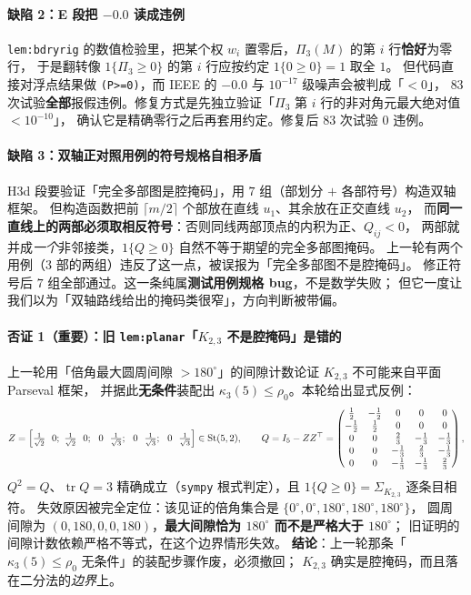 \documentclass[UTF8,11pt]{ctexart}
\theoremstyle{definition}
\newcommand{\tr}{\operatorname{tr}}
\begin{document}
\paragraph{缺陷 2：E 段把 $-0.0$ 读成违例}
\texttt{lem:bdryrig} 的数值检验里，把某个权 $w_i$ 置零后，$\Pi_3(M)$ 的第 $i$ 行\textbf{恰好}为零行，
于是翻转像 $1\{\Pi_3\ge0\}$ 的第 $i$ 行应按约定 $1\{0\ge0\}=1$ 取全 $1$。
但代码直接对浮点结果做 \texttt{(P>=0)}，而 IEEE 的 $-0.0$ 与 $10^{-17}$ 级噪声会被判成「$<0$」，
$83$ 次试验\textbf{全部}报假违例。修复方式是先独立验证「$\Pi_3$ 第 $i$ 行的非对角元最大绝对值 $<10^{-10}$」，
确认它是精确零行之后再套用约定。修复后 $83$ 次试验 $0$ 违例。

\paragraph{缺陷 3：双轴正对照用例的符号规格自相矛盾}
H3d 段要验证「完全多部图是腔掩码」，用 $7$ 组（部划分 $+$ 各部符号）构造双轴框架。
但构造函数把前 $\lceil m/2\rceil$ 个部放在直线 $u_1$、其余放在正交直线 $u_2$，
而\textbf{同一直线上的两部必须取相反符号}：否则同线两部顶点的内积为正、$Q_{ij}<0$，
两部就并成\emph{一个}非邻接类，$1\{Q\ge0\}$ 自然不等于期望的完全多部图掩码。
上一轮有两个用例（$3$ 部的两组）违反了这一点，被误报为「完全多部图不是腔掩码」。
修正符号后 $7$ 组全部通过。这一条纯属\textbf{测试用例规格 bug}，不是数学失败；
但它一度让我们以为「双轴路线给出的掩码类很窄」，方向判断被带偏。

\paragraph{否证 1（重要）：旧 \texttt{lem:planar}「$K_{2,3}$ 不是腔掩码」是\textbf{错的}}
上一轮用「倍角最大圆周间隙 $>180^\circ$」的间隙计数论证 $K_{2,3}$ 不可能来自平面 Parseval 框架，
并据此\textbf{无条件}装配出 $\kappa_3(5)\le\rho_0$。本轮给出显式反例：
\[
Z=\Bigl[\tfrac1{\sqrt2}\ \ 0;\ \tfrac1{\sqrt2}\ \ 0;\ \ 0\ \ \tfrac1{\sqrt3};\ \ 0\ \ \tfrac1{\sqrt3};\ \ 0\ \ \tfrac1{\sqrt3}\Bigr]\in\mathrm{St}(5,2),
\qquad Q=I_5-ZZ^\top=\begin{pmatrix}
\frac12&-\frac12&0&0&0\\[1pt]
-\frac12&\frac12&0&0&0\\[1pt]
0&0&\frac23&-\frac13&-\frac13\\[1pt]
0&0&-\frac13&\frac23&-\frac13\\[1pt]
0&0&-\frac13&-\frac13&\frac23
\end{pmatrix},
\]
$Q^2=Q$、$\tr Q=3$ 精确成立（\texttt{sympy} 根式判定），且 $1\{Q\ge0\}=\Sigma_{K_{2,3}}$ 逐条目相符。
失效原因被完全定位：该见证的倍角集合是 $\{0^\circ,0^\circ,180^\circ,180^\circ,180^\circ\}$，
圆周间隙为 $(0,180,0,0,180)$，\textbf{最大间隙恰为 $180^\circ$ 而不是严格大于 $180^\circ$}；
旧证明的间隙计数依赖严格不等式，在这个边界情形失效。
\textbf{结论}：上一轮那条「$\kappa_3(5)\le\rho_0$ 无条件」的装配步骤作废，必须撤回；
$K_{2,3}$ 确实是腔掩码，而且落在二分法的\emph{边界}上。
\end{document}
